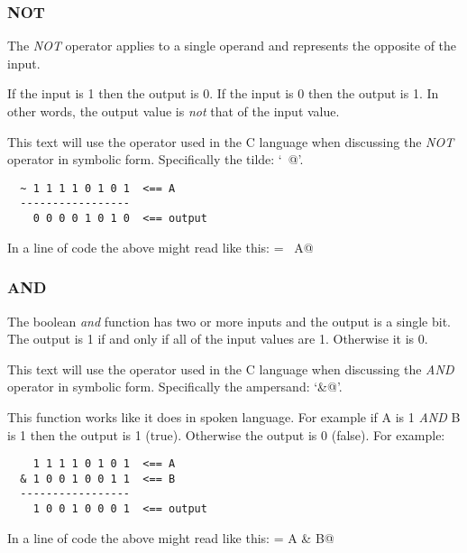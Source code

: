 \subsubsection{NOT}

The {\em NOT} operator applies to a single operand and represents the 
opposite of the input.

If the input is 1 then the output is 0.  If the input is 0 then the
output is 1.  In other words, the output value is {\em not} that of the 
input value.

This text will use the operator used in the C language when discussing 
the {\em NOT} operator in symbolic form.  Specifically the tilde: `\verb@~@'.

\begin{verbatim}
  ~ 1 1 1 1 0 1 0 1  <== A
  -----------------
    0 0 0 0 1 0 1 0  <== output
\end{verbatim}

In a line of code the above might read like this: \verb@output = ~A@

\subsubsection{AND}

The boolean {\em and} function has two or more inputs and the output is a
single bit.  The output is 1 if and only if all of the input values are 1.
Otherwise it is 0.

This text will use the operator used in the C language when discussing 
the {\em AND} operator in symbolic form.  Specifically the ampersand: `\verb@&@'.

This function works like it does in spoken language.  For example
if A is 1 {\em AND} B is 1 then the output is 1 (true).
Otherwise the output is 0 (false).  For example:

\begin{verbatim}
    1 1 1 1 0 1 0 1  <== A
  & 1 0 0 1 0 0 1 1  <== B
  -----------------
    1 0 0 1 0 0 0 1  <== output
\end{verbatim}

In a line of code the above might read like this: \verb@output = A & B@

